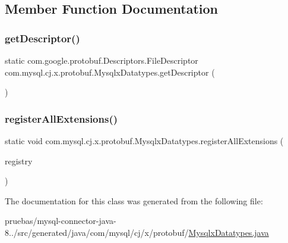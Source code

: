 \subsection{Member Function Documentation}
\mbox{\label{classcom_1_1mysql_1_1cj_1_1x_1_1protobuf_1_1_mysqlx_datatypes_a263040bb1e6f22af44716ceef6571fba}} 
\subsubsection{\texorpdfstring{get\+Descriptor()}{getDescriptor()}}
{\footnotesize\ttfamily static com.\+google.\+protobuf.\+Descriptors.\+File\+Descriptor com.\+mysql.\+cj.\+x.\+protobuf.\+Mysqlx\+Datatypes.\+get\+Descriptor (\begin{DoxyParamCaption}{ }\end{DoxyParamCaption})\hspace{0.3cm}{\ttfamily [static]}}

\mbox{\label{classcom_1_1mysql_1_1cj_1_1x_1_1protobuf_1_1_mysqlx_datatypes_a4b4a0b953acb8d94afb3b9a0ae9c1562}} 
\subsubsection{\texorpdfstring{register\+All\+Extensions()}{registerAllExtensions()}}
{\footnotesize\ttfamily static void com.\+mysql.\+cj.\+x.\+protobuf.\+Mysqlx\+Datatypes.\+register\+All\+Extensions (\begin{DoxyParamCaption}\item[{com.\+google.\+protobuf.\+Extension\+Registry}]{registry }\end{DoxyParamCaption})\hspace{0.3cm}{\ttfamily [static]}}



The documentation for this class was generated from the following file\+:\begin{DoxyCompactItemize}
\item 
pruebas/mysql-\/connector-\/java-\/8../src/generated/java/com/mysql/cj/x/protobuf/\mbox{\hyperlink{_mysqlx_datatypes_8java}{Mysqlx\+Datatypes.\+java}}\end{DoxyCompactItemize}
